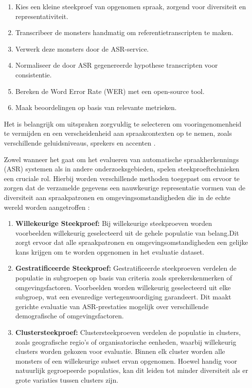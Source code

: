 \begin{enumerate}
    \item Kies een kleine steekproef van opgenomen spraak, zorgend voor diversiteit en representativiteit.
    \item Transcribeer de monsters handmatig om referentietranscripten te maken.
    \item Verwerk deze monsters door de ASR-service.
    \item Normaliseer de door ASR gegenereerde hypothese transcripten voor consistentie.
    \item Bereken de Word Error Rate (WER) met een open-source tool.
    \item Maak beoordelingen op basis van relevante metrieken.
\end{enumerate}

Het is belangrijk om uitspraken zorgvuldig te selecteren om vooringenomenheid te vermijden en een verscheidenheid aan spraakcontexten op te nemen, zoals verschillende geluidsniveaus, sprekers en accenten \autocite{awsmlblog2023}.


Zowel wanneer het gaat om het evalueren van automatische spraakherkennings (ASR) systemen als in andere onderzoeksgebieden, spelen steekproeftechnieken een cruciale rol. Hierbij worden verschillende methoden toegepast om ervoor te zorgen dat de verzamelde gegevens een nauwkeurige representatie vormen van de diversiteit aan spraakpatronen en omgevingsomstandigheden die in de echte wereld worden aangetroffen \autocite{huggingface2023asr}:
\begin{enumerate}[label=\arabic*.]
 
    \item \textbf{Willekeurige Steekproef:}
        Bij willekeurige steekproeven worden voorbeelden willekeurig geselecteerd uit de gehele populatie van belang.Dit zorgt ervoor dat alle spraakpatronen en omgevingsomstandigheden een gelijke kans krijgen om te worden opgenomen in het evaluatie dataset.
        
    \item \textbf{Gestratificeerde Steekproef:}
        Gestratificeerde steekproeven verdelen de populatie in subgroepen op basis van criteria zoals sprekerskenmerken of omgevingsfactoren. Voorbeelden worden willekeurig geselecteerd uit elke subgroep, wat een evenredige vertegenwoordiging garandeert. Dit maakt gerichte evaluatie van ASR-prestaties mogelijk over verschillende demografische of omgevingsfactoren.
        
    \item \textbf{Clustersteekproef:}
        Clustersteekproeven verdelen de populatie in clusters, zoals geografische regio's of organisatorische eenheden, waarbij willekeurig clusters worden gekozen voor evaluatie. Binnen elk cluster worden alle monsters of een willekeurige subset ervan opgenomen. Hoewel handig voor natuurlijk gegroepeerde populaties, kan dit leiden tot minder diversiteit als er grote variaties tussen clusters zijn.
         
\end{enumerate}


